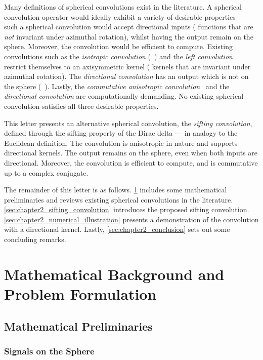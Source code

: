 Many definitions of spherical convolutions exist in the literature.
A spherical convolution operator would ideally exhibit a variety of desirable properties --- such a spherical convolution would accept directional inputs (\ie{} functions that are \emph{not} invariant under azimuthal rotation), whilst having the output remain on the sphere.
Moreover, the convolution would be efficient to compute.
Existing convolutions such as the \emph{isotropic convolution} (\eg{}~\cite{McEwen2007,Wei2011,Kennedy2011}) and the \emph{left convolution}~\cite{Kennedy2011,Driscoll1994} restrict themselves to an axisymmetric kernel (\ie{} kernels that are invariant under azimuthal rotation).
The \emph{directional convolution} has an output which is not on the sphere (\eg{}~\cite{McEwen2007,Wandelt2001}).
Lastly, the \emph{commutative anisotropic convolution}~\cite{Sadeghi2012,Khalid2012} and the \emph{directional convolution} are computationally demanding.
No existing spherical convolution satisfies all three desirable properties.

This letter presents an alternative spherical convolution, the \emph{sifting convolution}, defined through the sifting property of the Dirac delta --- in analogy to the Euclidean definition.
The convolution is anisotropic in nature and supports directional kernels.
The output remains on the sphere, even when both inputs are directional.
Moreover, the convolution is efficient to compute, and is commutative up to a complex conjugate.

The remainder of this letter is as follows.
\cref{sec:chapter2_preliminaries} includes some mathematical preliminaries and reviews existing spherical convolutions in the literature.
\cref{sec:chapter2_sifting_convolution} introduces the proposed sifting convolution.
\cref{sec:chapter2_numerical_illustration} presents a demonstration of the convolution with a directional kernel.
Lastly, \cref{sec:chapter2_conclusion} sets out some concluding remarks.

\section{Mathematical Background and Problem Formulation}\label{sec:chapter2_preliminaries}

\subsection{Mathematical Preliminaries}

\subsubsection{Signals on the Sphere}

